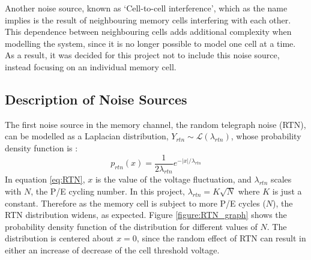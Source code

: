 \documentclass[11pt]{article}
\numberwithin{equation}{subsection}
\begin{document}
Another noise source, known as `Cell-to-cell interference', which as the name implies is the result of neighbouring memory cells interfering with each other. This dependence between neighbouring cells adds additional complexity when modelling the system, since it is no longer possible to model one cell at a time. As a result, it was decided for this project not to include this noise source, instead focusing on an individual memory cell.

\subsection{Description of Noise Sources}

The first noise source in the memory channel, the random telegraph noise (RTN), can be modelled as a Laplacian distribution, $Y_{rtn} \sim \mathcal{L}(\lambda_{rtn})$, whose probability density function is \cite{dong2012estimating}:
\begin{equation} \label{eq:RTN}
p_{rtn}(x) = \dfrac{1}{2\lambda_{rtn}}e^{-\lvert x \rvert / \lambda_{rtn}}
\end{equation}
In equation \ref{eq:RTN}, $x$ is the value of the voltage fluctuation, and $\lambda_{rtn}$ scales with $N$, the P/E cycling number. In this project, $\lambda_{rtn} = K \sqrt{N}$ where $K$ is just a constant. Therefore as the memory cell is subject to more P/E cycles ($N$), the RTN distribution widens, as expected. Figure \ref{figure:RTN_graph} shows the probability density function of the distribution for different values of $N$. The distribution is centered about $x=0$, since the random effect of RTN can result in either an increase of decrease of the cell threshold voltage.
\end{document}
